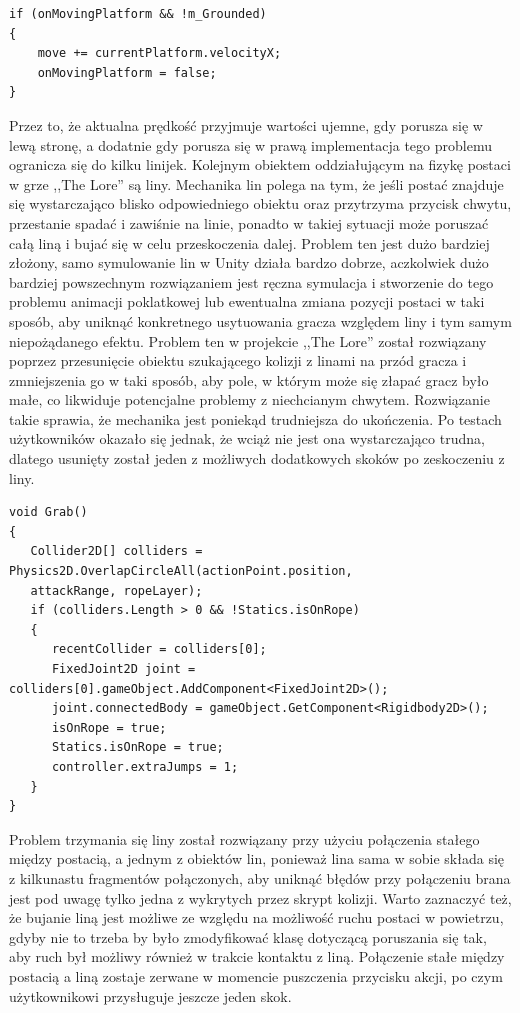 \documentclass[oneside,polski,logo]{amuthesis}
\begin{document}
\begin{lstlisting}[breaklines=true,
language={[Sharp]C},
rulecolor=\color{blue!80!black},
caption={Fragment klasy \texttt{PlayerMovement.cs}}
]
if (onMovingPlatform && !m_Grounded)
{
	move += currentPlatform.velocityX;
	onMovingPlatform = false;
}
\end{lstlisting}
Przez to, że aktualna prędkość przyjmuje wartości ujemne, gdy porusza się w lewą stronę, a dodatnie gdy porusza się w prawą implementacja tego problemu ogranicza się do kilku linijek.
Kolejnym obiektem oddziałującym na fizykę postaci w grze ,,The Lore'' są liny. Mechanika lin polega na tym, że jeśli postać znajduje się wystarczająco blisko odpowiedniego obiektu oraz przytrzyma przycisk chwytu, przestanie spadać i zawiśnie na linie, ponadto w takiej sytuacji może poruszać całą liną i bujać się w celu przeskoczenia dalej. Problem ten jest dużo bardziej złożony, samo symulowanie lin w Unity działa bardzo dobrze, aczkolwiek dużo bardziej powszechnym rozwiązaniem jest ręczna symulacja i stworzenie do tego problemu animacji poklatkowej lub ewentualna zmiana pozycji postaci w taki sposób, aby uniknąć konkretnego usytuowania gracza względem liny i tym samym niepożądanego efektu. Problem ten w projekcie ,,The Lore'' został rozwiązany poprzez przesunięcie obiektu szukającego kolizji z linami na przód gracza i zmniejszenia go w taki sposób, aby pole, w którym może się złapać gracz było małe, co likwiduje potencjalne problemy z niechcianym chwytem. Rozwiązanie takie sprawia, że mechanika jest poniekąd trudniejsza do ukończenia. Po testach użytkowników okazało się jednak, że wciąż nie jest ona wystarczająco trudna, dlatego usunięty został jeden z możliwych dodatkowych skoków po zeskoczeniu z liny.
\newpage
\begin{lstlisting}[breaklines=true,
language={[Sharp]C},
rulecolor=\color{blue!80!black},
caption={Fragment klasy \texttt{PlayerMovement.cs}}
]    
void Grab()
{
   Collider2D[] colliders = Physics2D.OverlapCircleAll(actionPoint.position,
   attackRange, ropeLayer);
   if (colliders.Length > 0 && !Statics.isOnRope)
   {
      recentCollider = colliders[0];
      FixedJoint2D joint = colliders[0].gameObject.AddComponent<FixedJoint2D>();
      joint.connectedBody = gameObject.GetComponent<Rigidbody2D>();
      isOnRope = true;
      Statics.isOnRope = true;
      controller.extraJumps = 1;
   }
}
\end{lstlisting}

Problem trzymania się liny został rozwiązany przy użyciu połączenia stałego między postacią, a jednym z obiektów lin, ponieważ lina sama w sobie składa się z kilkunastu fragmentów połączonych, aby uniknąć błędów przy połączeniu brana jest pod uwagę tylko jedna z wykrytych przez skrypt kolizji. Warto zaznaczyć też, że bujanie liną jest możliwe ze względu na możliwość ruchu postaci w powietrzu, gdyby nie to trzeba by było zmodyfikować klasę dotyczącą poruszania się tak, aby ruch był możliwy również w trakcie kontaktu z liną. Połączenie stałe między postacią a liną zostaje zerwane w momencie puszczenia przycisku akcji, po czym użytkownikowi przysługuje jeszcze jeden skok.
\end{document}
